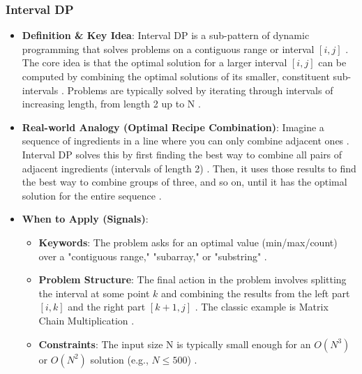 \documentclass{article}
\begin{document}
\subsubsection{Interval DP}
\begin{itemize}
\item \textbf{Definition \& Key Idea}: Interval DP is a sub-pattern of dynamic programming that solves problems on a contiguous range or interval $[i, j]$ \cite{745}. The core idea is that the optimal solution for a larger interval $[i, j]$ can be computed by combining the optimal solutions of its smaller, constituent sub-intervals \cite{747}. Problems are typically solved by iterating through intervals of increasing length, from length 2 up to N \cite{748}.
\item \textbf{Real-world Analogy (Optimal Recipe Combination)}: Imagine a sequence of ingredients in a line where you can only combine adjacent ones \cite{749, 750}. Interval DP solves this by first finding the best way to combine all pairs of adjacent ingredients (intervals of length 2) \cite{752}. Then, it uses those results to find the best way to combine groups of three, and so on, until it has the optimal solution for the entire sequence \cite{753}.
\item \textbf{When to Apply (Signals)}:
\begin{itemize}
\item \textbf{Keywords}: The problem asks for an optimal value (min/max/count) over a "contiguous range," "subarray," or "substring" \cite{758}.
\item \textbf{Problem Structure}: The final action in the problem involves splitting the interval at some point $k$ and combining the results from the left part $[i, k]$ and the right part $[k+1, j]$ \cite{759}. The classic example is Matrix Chain Multiplication \cite{760}.
\item \textbf{Constraints}: The input size N is typically small enough for an $O(N^3)$ or $O(N^2)$ solution (e.g., $N\le500$) \cite{761}.
\end{itemize}
\end{itemize}
\end{document}
